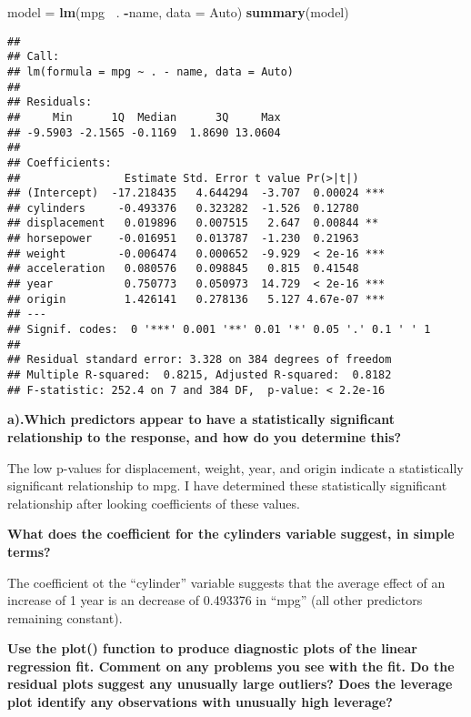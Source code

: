 \documentclass[]{article}
\newenvironment{Shaded}{\begin{snugshade}}{\end{snugshade}}
\newcommand{\KeywordTok}[1]{\textcolor[rgb]{0.13,0.29,0.53}{\textbf{#1}}}
\newcommand{\DataTypeTok}[1]{\textcolor[rgb]{0.13,0.29,0.53}{#1}}
\newcommand{\StringTok}[1]{\textcolor[rgb]{0.31,0.60,0.02}{#1}}
\newcommand{\OperatorTok}[1]{\textcolor[rgb]{0.81,0.36,0.00}{\textbf{#1}}}
\newcommand{\NormalTok}[1]{#1}
\begin{document}
\begin{Shaded}
\begin{Highlighting}[]
\NormalTok{model =}\StringTok{ }\KeywordTok{lm}\NormalTok{(mpg }\OperatorTok{~}\NormalTok{. }\OperatorTok{-}\NormalTok{name, }\DataTypeTok{data =}\NormalTok{ Auto)}
\KeywordTok{summary}\NormalTok{(model)}
\end{Highlighting}
\end{Shaded}

\begin{verbatim}
## 
## Call:
## lm(formula = mpg ~ . - name, data = Auto)
## 
## Residuals:
##     Min      1Q  Median      3Q     Max 
## -9.5903 -2.1565 -0.1169  1.8690 13.0604 
## 
## Coefficients:
##                Estimate Std. Error t value Pr(>|t|)    
## (Intercept)  -17.218435   4.644294  -3.707  0.00024 ***
## cylinders     -0.493376   0.323282  -1.526  0.12780    
## displacement   0.019896   0.007515   2.647  0.00844 ** 
## horsepower    -0.016951   0.013787  -1.230  0.21963    
## weight        -0.006474   0.000652  -9.929  < 2e-16 ***
## acceleration   0.080576   0.098845   0.815  0.41548    
## year           0.750773   0.050973  14.729  < 2e-16 ***
## origin         1.426141   0.278136   5.127 4.67e-07 ***
## ---
## Signif. codes:  0 '***' 0.001 '**' 0.01 '*' 0.05 '.' 0.1 ' ' 1
## 
## Residual standard error: 3.328 on 384 degrees of freedom
## Multiple R-squared:  0.8215, Adjusted R-squared:  0.8182 
## F-statistic: 252.4 on 7 and 384 DF,  p-value: < 2.2e-16
\end{verbatim}

\textbf{a).Which predictors appear to have a statistically significant
relationship to the response, and how do you determine this? }

The low p-values for displacement, weight, year, and origin indicate a
statistically significant relationship to mpg. I have determined these
statistically significant relationship after looking coefficients of
these values.

\textbf{What does the coefficient for the cylinders variable suggest, in
simple terms?}

The coefficient ot the ``cylinder'' variable suggests that the average
effect of an increase of 1 year is an decrease of 0.493376 in ``mpg''
(all other predictors remaining constant).

\textbf{Use the plot() function to produce diagnostic plots of the
linear regression fit. Comment on any problems you see with the fit. Do
the residual plots suggest any unusually large outliers? Does the
leverage plot identify any observations with unusually high leverage?}
\end{document}
